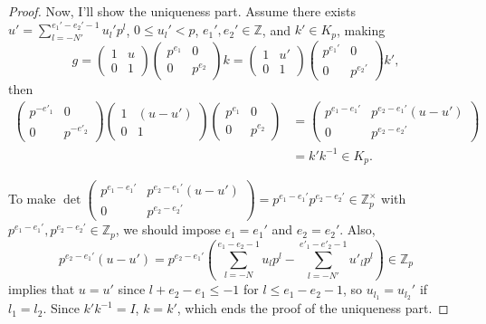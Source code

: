 \documentclass[a4paper, 12pt]{article}
\theoremstyle{Mydefinition}
\theoremstyle{Mytheorem}
\begin{document}
\begin{enumerate}
\begin{proof}
    Now, I'll show the uniqueness part. Assume there exists $u'=\sum_{l=-N'}^{e_1'-e_2'-1}u_l' p^l$, $0\leq u_l'<p$, $e_1',e_2'\in\mathbb{Z}$, and $k'\in K_p$, making
    \begin{equation}
        g = \begin{pmatrix}
            1 & u \\
            0 & 1
        \end{pmatrix}
        \begin{pmatrix}
            p^{e_1} & 0 \\
            0 & p^{e_2}
        \end{pmatrix}k = \begin{pmatrix}
            1 & u' \\
            0 & 1
        \end{pmatrix}
        \begin{pmatrix}
            p^{e_1'} & 0 \\
            0 & p^{e_2'}
        \end{pmatrix}k',
    \end{equation}
    then
    \begin{equation}
    \begin{split}
        \begin{pmatrix}
            p^{-e'_1} & 0 \\
            0 & p^{-e'_2}
        \end{pmatrix}\begin{pmatrix}
            1 & (u-u') \\
            0 & 1
        \end{pmatrix}
        \begin{pmatrix}
            p^{e_1} & 0 \\
            0 & p^{e_2}
        \end{pmatrix} &=\begin{pmatrix}
            p^{e_1-e_1'} & p^{e_2-e_1'}(u-u') \\
            0 & p^{e_2-e_2'}
        \end{pmatrix}\\
        &=k'k^{-1}\in K_p.
    \end{split}
    \end{equation}
    
    To make $\det \begin{pmatrix}
            p^{e_1-e_1'} & p^{e_2-e_1'}(u-u') \\
            0 & p^{e_2-e_2'}
        \end{pmatrix} = p^{e_1-e_1'}p^{e_2-e_2'}\in \mathbb{Z}_p^\times$ with $p^{e_1-e_1'}, p^{e_2-e_2'}\in\mathbb{Z}_p$, we should impose $e_1=e_1'$ and $e_2=e_2'$. Also,
        \begin{equation}
            p^{e_2-e_1'}(u-u') = p^{e_2-e_1'}(\sum_{l=-N}^{e_1-e_2-1}u_lp^l-\sum_{l=-N'}^{e'_1-e'_2-1}u'_lp^l)\in\mathbb{Z}_p
        \end{equation}
        implies that $u=u'$ since $l+e_2-e_1\leq -1$ for $l\leq e_1-e_2-1$, so $u_{l_1}=u_{l_2}'$ if $l_1=l_2$. Since $k'k^{-1}=I$, $k=k'$, which ends the proof of the uniqueness part.
    \end{proof}
    

\end{enumerate}
\end{document}
